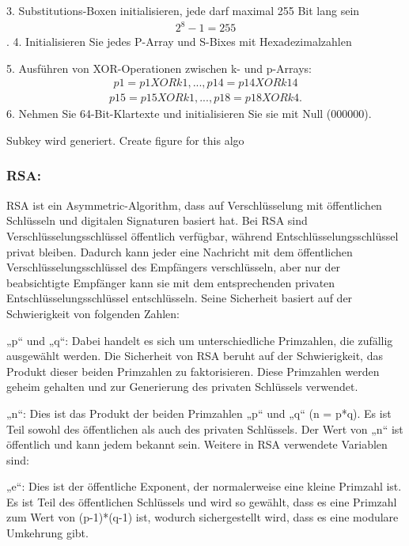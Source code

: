 3. Substitutions-Boxen initialisieren, jede darf maximal 255 Bit lang sein\begin{align*}
    2^8 -1 = 255 \end{align*}.
4. Initialisieren Sie jedes P-Array und S-Bixes mit Hexadezimalzahlen

5. Ausführen von XOR-Operationen zwischen k- und p-Arrays:\begin{align*} p1 = p1 XOR k1, ..., p14 = p14 XOR k14 \end{align*} \begin{align*} p15 = p15 XOR k1 , ... , p18 = p18 XOR k4.\end{align*}
6. Nehmen Sie 64-Bit-Klartexte und initialisieren Sie sie mit Null (000000).

Subkey wird generiert.
Create figure for this algo

\subsubsection{RSA:}

RSA ist ein Asymmetric-Algorithm, dass auf Verschlüsselung mit öffentlichen Schlüsseln und digitalen Signaturen basiert hat. Bei RSA sind Verschlüsselungsschlüssel öffentlich verfügbar, während Entschlüsselungsschlüssel privat bleiben. Dadurch kann jeder eine Nachricht mit dem öffentlichen Verschlüsselungsschlüssel des Empfängers verschlüsseln, aber nur der beabsichtigte Empfänger kann sie mit dem entsprechenden privaten Entschlüsselungsschlüssel entschlüsseln. Seine Sicherheit basiert auf der Schwierigkeit von folgenden Zahlen:

„p“ und „q“: Dabei handelt es sich um unterschiedliche Primzahlen, die zufällig ausgewählt werden. Die Sicherheit von RSA beruht auf der Schwierigkeit, das Produkt dieser beiden Primzahlen zu faktorisieren. Diese Primzahlen werden geheim gehalten und zur Generierung des privaten Schlüssels verwendet.

„n“: Dies ist das Produkt der beiden Primzahlen „p“ und „q“ (n = p*q). Es ist Teil sowohl des öffentlichen als auch des privaten Schlüssels. Der Wert von „n“ ist öffentlich und kann jedem bekannt sein.
Weitere in RSA verwendete Variablen sind:

„e“: Dies ist der öffentliche Exponent, der normalerweise eine kleine Primzahl ist. Es ist Teil des öffentlichen Schlüssels und wird so gewählt, dass es eine Primzahl zum Wert von (p-1)*(q-1) ist, wodurch sichergestellt wird, dass es eine modulare Umkehrung gibt.

